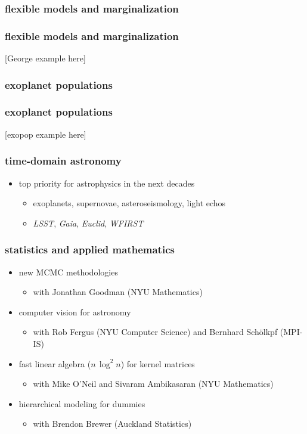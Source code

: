 \documentclass{beamer}
\newcommand{\project}[1]{\textsl{#1}}
\begin{document}
\begin{frame}
  \frametitle{flexible models and marginalization}
\end{frame}

\begin{frame}
  \frametitle{flexible models and marginalization}
  [George example here]
\end{frame}

\begin{frame}
  \frametitle{exoplanet populations}
\end{frame}

\begin{frame}
  \frametitle{exoplanet populations}
  [exopop example here]
\end{frame}

\begin{frame}
  \frametitle{time-domain astronomy}
  \begin{itemize}
  \item top priority for astrophysics in the next decades
    \begin{itemize}
    \item exoplanets, supernovae, asteroseismology, light echos
    \item \project{LSST}, \project{Gaia}, \project{Euclid}, \project{WFIRST}
    \end{itemize}
  \end{itemize}
\end{frame}

\begin{frame}
  \frametitle{statistics and applied mathematics}
  \begin{itemize}
  \item new MCMC methodologies
    \begin{itemize}
    \item with Jonathan Goodman (NYU Mathematics)
    \end{itemize}
  \item computer vision for astronomy
    \begin{itemize}
    \item with Rob Fergus (NYU Computer Science) and Bernhard Sch\"olkpf (MPI-IS)
    \end{itemize}
  \item fast linear algebra ($n\,\log^2n$) for kernel matrices
    \begin{itemize}
    \item with Mike O'Neil and Sivaram Ambikasaran (NYU Mathematics)
    \end{itemize}
  \item hierarchical modeling for dummies
    \begin{itemize}
    \item with Brendon Brewer (Auckland Statistics)
    \end{itemize}
  \end{itemize}
\end{frame}
\end{document}
